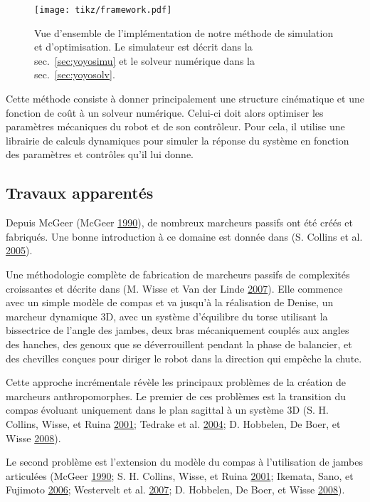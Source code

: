 \documentclass[french,A4paper,]{book}
\begin{document}
\begin{figure}
\centering
\texttt{[image: tikz/framework.pdf]}
\caption{Vue d'ensemble de l'implémentation de notre méthode de
simulation et d'optimisation. Le simulateur est décrit dans la
sec.~\ref{sec:yoyosimu} et le solveur numérique dans la
sec.~\ref{sec:yoyosolv}.}\label{fig:framework}
\end{figure}

Cette méthode consiste à donner principalement une structure cinématique
et une fonction de coût à un solveur numérique. Celui-ci doit alors
optimiser les paramètres mécaniques du robot et de son contrôleur. Pour
cela, il utilise une librairie de calculs dynamiques pour simuler la
réponse du système en fonction des paramètres et contrôles qu'il lui
donne.

\subsection{Travaux apparentés}\label{travaux-apparentuxe9s}

Depuis McGeer (McGeer \protect\hyperlink{ref-mcgeer90}{1990}), de
nombreux marcheurs passifs ont été créés et fabriqués. Une bonne
introduction à ce domaine est donnée dans (S. Collins et al.
\protect\hyperlink{ref-collins05}{2005}).

Une méthodologie complète de fabrication de marcheurs passifs de
complexités croissantes et décrite dans (M. Wisse et Van der Linde
\protect\hyperlink{ref-wisse07}{2007}). Elle commence avec un simple
modèle de compas et va jusqu'à la réalisation de Denise, un marcheur
dynamique 3D, avec un système d'équilibre du torse utilisant la
bissectrice de l'angle des jambes, deux bras mécaniquement couplés aux
angles des hanches, des genoux que se déverrouillent pendant la phase de
balancier, et des chevilles conçues pour diriger le robot dans la
direction qui empêche la chute.

Cette approche incrémentale révèle les principaux problèmes de la
création de marcheurs anthropomorphes. Le premier de ces problèmes est
la transition du compas évoluant uniquement dans le plan sagittal à un
système 3D (S. H. Collins, Wisse, et Ruina
\protect\hyperlink{ref-collins01}{2001}; Tedrake et al.
\protect\hyperlink{ref-tedrake04}{2004}; D. Hobbelen, De Boer, et Wisse
\protect\hyperlink{ref-hobbelen08}{2008}).

Le second problème est l'extension du modèle du compas à l'utilisation
de jambes articulées (McGeer \protect\hyperlink{ref-mcgeer90}{1990}; S.
H. Collins, Wisse, et Ruina \protect\hyperlink{ref-collins01}{2001};
Ikemata, Sano, et Fujimoto \protect\hyperlink{ref-ikemata06}{2006};
Westervelt et al. \protect\hyperlink{ref-westervelt07}{2007}; D.
Hobbelen, De Boer, et Wisse \protect\hyperlink{ref-hobbelen08}{2008}).
\end{document}
